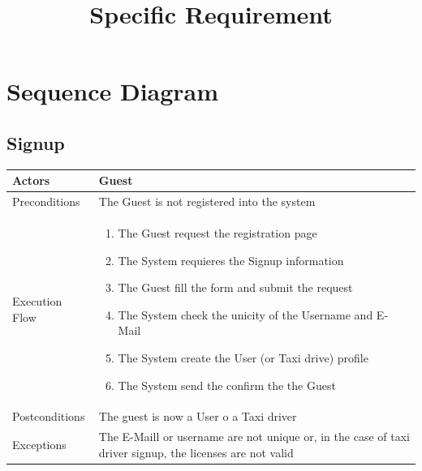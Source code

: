 \documentclass[english]{article}
\begin{document}
\title{Specific Requirement}

\section{Sequence Diagram}

\subsection{Signup}

\begin{tabular}{lp{8cm}}
\hline
Actors & Guest \\
\hline
Preconditions &  The Guest is not registered into the system \\
\hline
Execution Flow &  
		\begin{enumerate}
			\item The Guest request the registration page
			\item The System requieres the Signup information
			\item The Guest fill the form and submit the request
			\item The System check the unicity of the Username and E-Mail
			\item The System create the User (or Taxi drive) profile
			\item The System send the confirm the the Guest
		\end{enumerate} 
	\\ 
\hline
Postconditions & The guest is now a User o a Taxi driver \\
\hline
Exceptions & The E-Maill or username are not unique or, in the case of taxi driver signup, the licenses are not valid
\end{tabular}
\end{document}
